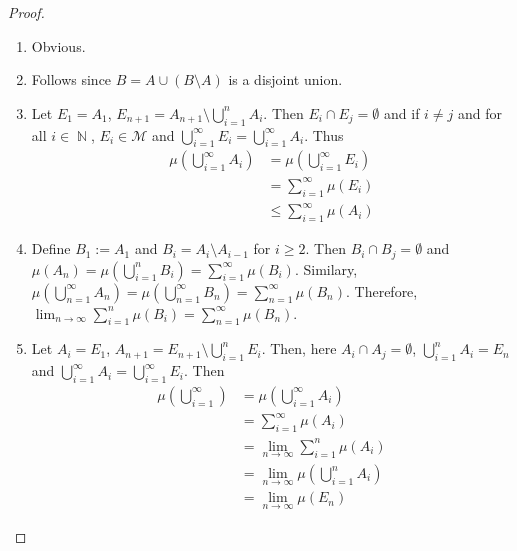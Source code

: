 \documentclass[12pt, a4paper]{memoir}
\DeclareMathOperator{\N}{{\mathbb{N}}}
\theoremstyle{nonumberplain}
\newtheorem{proof}{Proof}
\begin{document}
\begin{proof}
    \begin{enumerate}
        \item Obvious.
        \item Follows since $B=A\cup(B\setminus A)$ is a disjoint union.
        \item Let $E_1=A_1$, $E_{n+1}=A_{n+1}\setminus\bigcup_{i=1}^n A_i$.
            Then $E_i\cap E_j=\emptyset$ and if $i\neq j$ and for all $i\in\N$, $E_i\in\mathcal{M}$ and $\bigcup_{i=1}^\infty E_i=\bigcup_{i=1}^\infty A_i$.
            Thus
            \begin{align*}
                \mu\left(\bigcup\limits_{i=1}^\infty A_i\right)&=\mu\left(\bigcup\limits_{i=1}^\infty E_i\right)\\
                                                               &= \sum\limits_{i=1}^\infty \mu(E_i)\\
                                                               &\leq \sum\limits_{i=1}^\infty\mu(A_i)
            \end{align*}
        \item Define $B_1:=A_1$ and $B_i=A_i\setminus A_{i-1}$ for $i\geq 2$.
            Then $B_i\cap B_j=\emptyset$ and $\mu(A_n)=\mu\left(\bigcup_{i=1}^n B_i\right)=\sum_{i=1}^\infty\mu(B_i)$.
            Similary, $\mu\left(\bigcup_{n=1}^\infty A_n\right)=\mu\left(\bigcup_{n=1}^\infty B_n\right)=\sum_{n=1}^\infty\mu(B_n)$.
            Therefore, $\lim_{n\to\infty}\sum_{i=1}^n \mu(B_i)=\sum_{n=1}^\infty \mu(B_n)$.
        \item Let $A_i=E_1$, $A_{n+1}=E_{n+1}\setminus\bigcup_{i=1}^n E_i$.
            Then, here $A_i\cap A_j=\emptyset$, $\bigcup_{i=1}^n A_i=E_n$ and $\bigcup_{i=1}^\infty A_i=\bigcup_{i=1}^\infty E_i$.
            Then
            \begin{align*}
                \mu\left(\bigcup\limits_{i=1}^\infty\right) &= \mu\left(\bigcup\limits_{i=1}^\infty A_i\right)\\
                                                            &= \sum\limits_{i=1}^\infty \mu(A_i)\\
                                                            &= \lim_{n\to\infty}\sum\limits_{i=1}^n \mu(A_i)\\
                                                            &= \lim_{n\to\infty} \mu\left(\bigcup\limits_{i=1}^n A_i\right)\\
                                                            &= \lim_{n\to\infty}\mu(E_n)

\end{align*}
\end{enumerate}
\end{proof}
\end{document}
